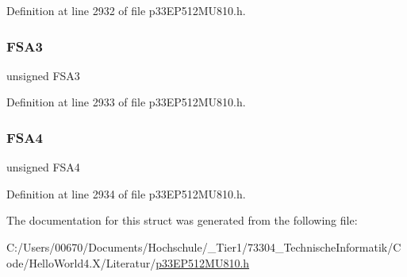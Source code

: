 Definition at line 2932 of file p33\+E\+P512\+M\+U810.\+h.

\mbox{\label{structtag_c1_f_c_t_r_l_b_i_t_s_a20bcf2bebd5be6be1a31fce2812487f1}} 
\subsubsection{\texorpdfstring{F\+S\+A3}{FSA3}}
{\footnotesize\ttfamily unsigned F\+S\+A3}



Definition at line 2933 of file p33\+E\+P512\+M\+U810.\+h.

\mbox{\label{structtag_c1_f_c_t_r_l_b_i_t_s_a612519942ed2303c487fcdfcac0d4efc}} 
\subsubsection{\texorpdfstring{F\+S\+A4}{FSA4}}
{\footnotesize\ttfamily unsigned F\+S\+A4}



Definition at line 2934 of file p33\+E\+P512\+M\+U810.\+h.



The documentation for this struct was generated from the following file\+:\begin{DoxyCompactItemize}
\item 
C\+:/\+Users/00670/\+Documents/\+Hochschule/\+\_\+\+Tier1/73304\+\_\+\+Technische\+Informatik/\+Code/\+Hello\+World4.\+X/\+Literatur/\hyperlink{p33_e_p512_m_u810_8h}{p33\+E\+P512\+M\+U810.\+h}\end{DoxyCompactItemize}
